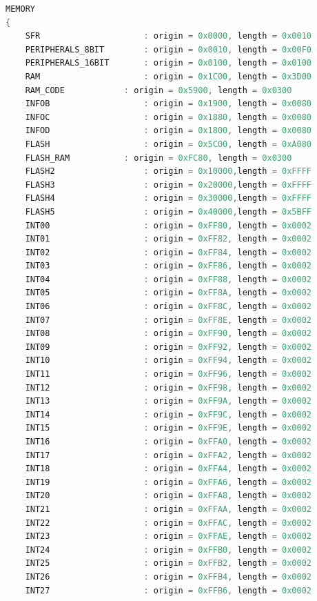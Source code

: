 \documentclass[LaM,binding=0.6cm]{../sapthesis}
\begin{document}
\begin{lstlisting}[language=C]
MEMORY
{
    SFR                     : origin = 0x0000, length = 0x0010
    PERIPHERALS_8BIT        : origin = 0x0010, length = 0x00F0
    PERIPHERALS_16BIT       : origin = 0x0100, length = 0x0100
    RAM                     : origin = 0x1C00, length = 0x3D00	
    RAM_CODE		    : origin = 0x5900, length = 0x0300
    INFOB                   : origin = 0x1900, length = 0x0080
    INFOC                   : origin = 0x1880, length = 0x0080
    INFOD                   : origin = 0x1800, length = 0x0080
    FLASH                   : origin = 0x5C00, length = 0xA080	
    FLASH_RAM		    : origin = 0xFC80, length = 0x0300
    FLASH2                  : origin = 0x10000,length = 0xFFFF
    FLASH3                  : origin = 0x20000,length = 0xFFFF
    FLASH4                  : origin = 0x30000,length = 0xFFFF
    FLASH5                  : origin = 0x40000,length = 0x5BFF
    INT00                   : origin = 0xFF80, length = 0x0002
    INT01                   : origin = 0xFF82, length = 0x0002
    INT02                   : origin = 0xFF84, length = 0x0002
    INT03                   : origin = 0xFF86, length = 0x0002
    INT04                   : origin = 0xFF88, length = 0x0002
    INT05                   : origin = 0xFF8A, length = 0x0002
    INT06                   : origin = 0xFF8C, length = 0x0002
    INT07                   : origin = 0xFF8E, length = 0x0002
    INT08                   : origin = 0xFF90, length = 0x0002
    INT09                   : origin = 0xFF92, length = 0x0002
    INT10                   : origin = 0xFF94, length = 0x0002
    INT11                   : origin = 0xFF96, length = 0x0002
    INT12                   : origin = 0xFF98, length = 0x0002
    INT13                   : origin = 0xFF9A, length = 0x0002
    INT14                   : origin = 0xFF9C, length = 0x0002
    INT15                   : origin = 0xFF9E, length = 0x0002
    INT16                   : origin = 0xFFA0, length = 0x0002
    INT17                   : origin = 0xFFA2, length = 0x0002
    INT18                   : origin = 0xFFA4, length = 0x0002
    INT19                   : origin = 0xFFA6, length = 0x0002
    INT20                   : origin = 0xFFA8, length = 0x0002
    INT21                   : origin = 0xFFAA, length = 0x0002
    INT22                   : origin = 0xFFAC, length = 0x0002
    INT23                   : origin = 0xFFAE, length = 0x0002
    INT24                   : origin = 0xFFB0, length = 0x0002
    INT25                   : origin = 0xFFB2, length = 0x0002
    INT26                   : origin = 0xFFB4, length = 0x0002
    INT27                   : origin = 0xFFB6, length = 0x0002

\end{lstlisting}
\end{document}

